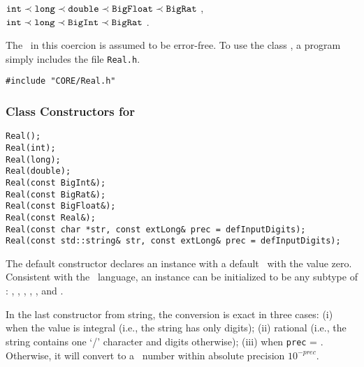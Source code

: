 \begin{center}
$ \mbox{\tt int} \prec \mbox{\tt long} \prec \mbox{\tt double} \prec \mbox{\tt BigFloat} \prec \mbox{\tt BigRat} $ , \\
$ \mbox{\tt int} \prec \mbox{\tt long} \prec \mbox{\tt BigInt} \prec \mbox{\tt BigRat} $ .
\end{center}

The \BF\ in this coercion is assumed to be error-free. 
To use the class \real, a program simply includes the file
{\tt Real.h}.

\nopagebreak
\begin{progb}{
\> \tt \#include "CORE/Real.h"
}\end{progb}

\subsubsection{Class Constructors for \real}

\begin{progb}{
\> \tt  Real();\\
\> \tt  Real(int);\\
\> \tt  Real(long);\\
\> \tt  Real(double);\\
\> \tt  Real(const BigInt\&);\\
\> \tt  Real(const BigRat\&);\\
\> \tt  Real(const BigFloat\&);\\
\> \tt  Real(const Real\&);\\
\> \tt  Real(const char *str, const extLong\& prec = defInputDigits); \\
\> \tt  Real(const std::string\& str, const extLong\& prec = defInputDigits);
}\end{progb}

The default constructor declares an instance with a default 
\real\ with the value zero.
Consistent with the \cpp\ language, an instance can be
initialized to be any subtype of \real: \int, \lng, \double, \Int,
\Rat, and \BF. 

In the last constructor from string, the conversion is exact in three cases:
(i) when the value is integral (i.e., the string has only digits);
(ii) rational (i.e., the string contains one `/' character and digits otherwise);
(iii) when {\tt prec} = \coreInfty.
Otherwise, it will convert to a \BF\ number within absolute precision
$10^{-\mathit{prec}}$.

\bigskip

